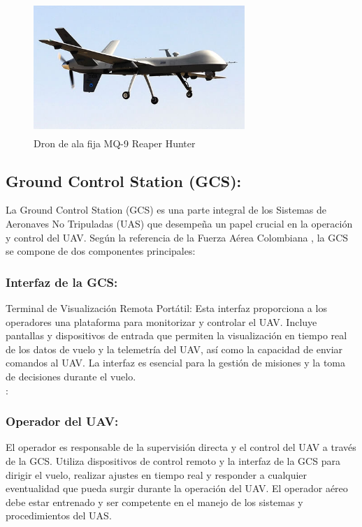 \begin{figure}[H]
    \centering
    \includegraphics[width=8cm, height=5cm]{Imagenes/Marco Teorico/raf_reaper_fly.jpg}
    \caption{Dron de ala fija MQ-9 Reaper Hunter \cite{reaper}}
    \label{fig:enter-label}
\end{figure}


\subsection{Ground Control Station (GCS):}

La Ground Control Station (GCS) es una parte integral de los Sistemas de Aeronaves No Tripuladas (UAS) que desempeña un papel crucial en la operación y control del UAV. Según la referencia de la Fuerza Aérea Colombiana \cite{UAS-FAC}, la GCS se compone de dos componentes principales: \\

\subsubsection{Interfaz de la GCS:}

Terminal de Visualización Remota Portátil: Esta interfaz proporciona a los operadores una plataforma para monitorizar y controlar el UAV. Incluye pantallas y dispositivos de entrada que permiten la visualización en tiempo real de los datos de vuelo y la telemetría del UAV, así como la capacidad de enviar comandos al UAV. La interfaz es esencial para la gestión de misiones y la toma de decisiones durante el vuelo. \\
:

\subsubsection{Operador del UAV:} El operador es responsable de la supervisión directa y el control del UAV a través de la GCS. Utiliza dispositivos de control remoto y la interfaz de la GCS para dirigir el vuelo, realizar ajustes en tiempo real y responder a cualquier eventualidad que pueda surgir durante la operación del UAV. El operador aéreo debe estar entrenado y ser competente en el manejo de los sistemas y procedimientos del UAS.\\

